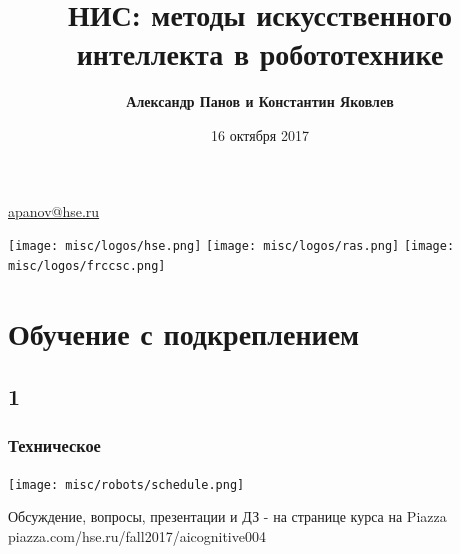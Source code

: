 \documentclass[default]{beamer}
\begin{document}
	
	\title[РобоНИС]{НИС: методы искусственного интеллекта в робототехнике}
	\author[Панов, Яковлев]{\textbf{Александр Панов и Константин Яковлев}}
	\date{16 октября 2017} 
	
	{
	\begin{frame}
		
		\titlepage
		\centering
		\href{mailto:apanov@hse.ru}{apanov@hse.ru}
		
		\texttt{[image: misc/logos/hse.png]} \hspace{10pt}
		\texttt{[image: misc/logos/ras.png]} \hspace{10pt}
		\texttt{[image: misc/logos/frccsc.png]}
		
	\end{frame}
	}	

	\section{Обучение с подкреплением}
	\subsection{1}
	\begin{frame}
		\frametitle{Техническое}
		
		\centering
		\texttt{[image: misc/robots/schedule.png]}
		
		\par\bigskip
		
		Обсуждение, вопросы, презентации и ДЗ - на странице курса на Piazza piazza.com/hse.ru/fall2017/aicognitive004
		
	\end{frame}
\end{document}
